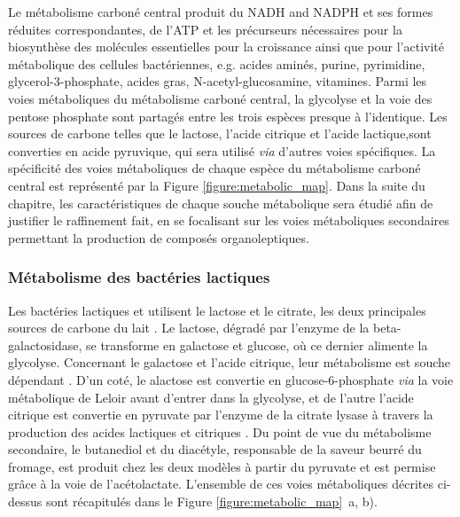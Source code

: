 \documentclass[../main.tex]{subfiles}
\begin{document}
Le métabolisme carboné central produit du NADH and NADPH et ses formes réduites correspondantes, de l'ATP et les précurseurs nécessaires pour la biosynthèse des molécules essentielles pour la croissance ainsi que pour l'activité métabolique des cellules bactériennes, e.g. acides aminés, purine, pyrimidine, glycerol-3-phosphate, acides gras, N-acetyl-glucosamine, vitamines. Parmi les voies métaboliques du métabolisme carboné central, la glycolyse et la voie des pentose phosphate sont partagés entre les trois espèces presque à l'identique. Les sources de carbone telles que le lactose, l'acide citrique et l'acide lactique,sont converties en acide pyruvique, qui sera utilisé \textit{via} d'autres voies spécifiques. La spécificité des voies métaboliques de chaque espèce du métabolisme carboné central est représenté par la Figure \ref{figure:metabolic_map}. Dans la suite du chapitre, les caractéristiques de chaque souche métabolique sera étudié afin de justifier le raffinement fait, en se focalisant sur les voies métaboliques secondaires permettant la production de composés organoleptiques.

\subsubsection{Métabolisme des bactéries lactiques}
Les bactéries lactiques \lactis et \plantarum utilisent le lactose et le citrate, les deux principales sources de carbone du lait \citep{Widyastuti2014}. Le lactose, dégradé par l'enzyme de la beta-galactosidase, se transforme en galactose et glucose, où ce dernier alimente la glycolyse. Concernant le galactose et l'acide citrique, leur métabolisme est souche dépendant \citep{Palles1998}. D'un coté, le alactose est convertie en glucose-6-phosphate \textit{via} la voie métabolique de Leloir avant d'entrer dans la glycolyse, et de l'autre l'acide citrique est convertie en pyruvate par l'enzyme de la citrate lysase à travers la production des acides lactiques et citriques \citep{alma991000892589705596}. Du point de vue du métabolisme secondaire, le butanediol et du diacétyle, responsable de la saveur beurré du fromage, est produit chez les deux modèles à partir du pyruvate et est permise grâce à la voie de l'acétolactate. L'ensemble de ces voies métaboliques décrites ci-dessus sont récapitulés dans le Figure \ref{figure:metabolic_map}~a, b). \\

\paragraph{\lactis}
\end{document}
